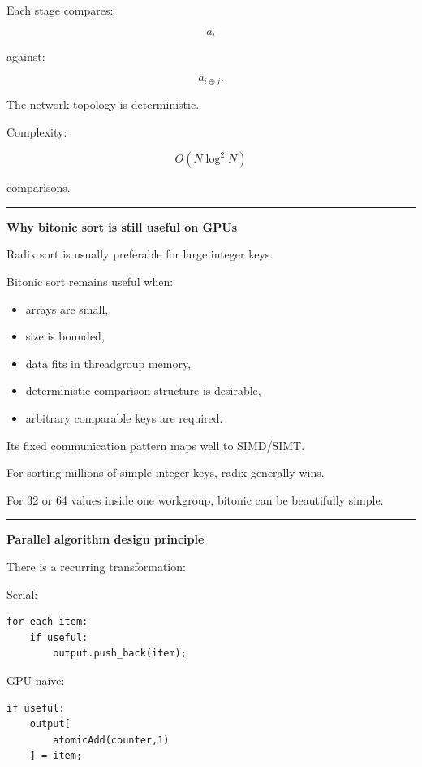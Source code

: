Each stage compares:

\[
a_i
\]

against:

\[
a_{i\oplus j}.
\]

The network topology is deterministic.

Complexity:

\[
\boxed{
O(N\log^2N)
}
\]

comparisons.

\begin{center}\rule{0.5\linewidth}{0.5pt}\end{center}

\textbf{Why bitonic sort is still useful on GPUs}

Radix sort is usually preferable for large integer keys.

Bitonic sort remains useful when:

\begin{itemize}
\tightlist
\item
  arrays are small,
\item
  size is bounded,
\item
  data fits in threadgroup memory,
\item
  deterministic comparison structure is desirable,
\item
  arbitrary comparable keys are required.
\end{itemize}

Its fixed communication pattern maps well to SIMD/SIMT.

For sorting millions of simple integer keys, radix generally wins.

For 32 or 64 values inside one workgroup, bitonic can be beautifully simple.

\begin{center}\rule{0.5\linewidth}{0.5pt}\end{center}

\textbf{Parallel algorithm design principle}

There is a recurring transformation:

Serial:

\protect{}\label{x1rcxl}%
\begin{verbatim}
for each item:
    if useful:
        output.push_back(item);
\end{verbatim}

GPU-naive:

\protect{}\label{di1gjk}%
\begin{verbatim}
if useful:
    output[
        atomicAdd(counter,1)
    ] = item;
\end{verbatim}

